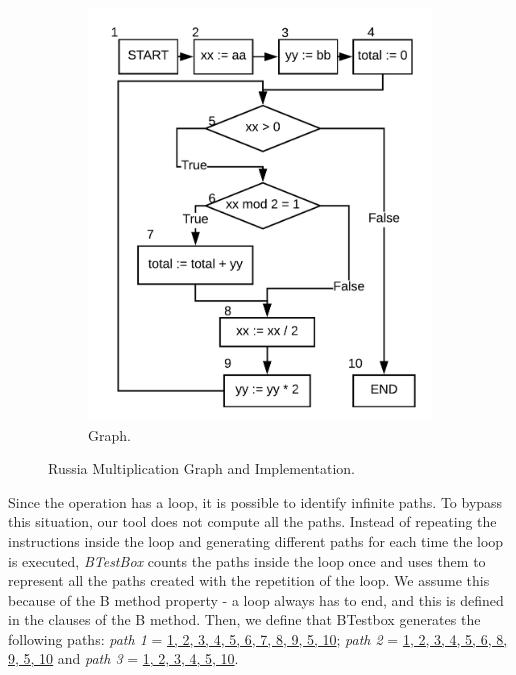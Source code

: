 \documentclass[runningheads]{llncs}
\begin{document}
\begin{figure}
\begin{minipage}{0.45\textwidth}
\begin{subfigure}{\textwidth}
\includegraphics[width = \textwidth]{imagens/lacoGrafo.png}
\caption{Graph.}
\label{fig:russianMultGraph}
\end{subfigure}
\end{minipage}
\caption{Russia Multiplication Graph and Implementation.}
\end{figure}
Since the operation has a loop, it is possible to identify infinite paths. 
To bypass this situation, our tool does not compute all the paths. Instead of repeating the instructions inside the loop and generating different paths for each time the loop is executed, \textit{BTestBox} counts the paths inside the loop once and uses them to represent all the paths created with the repetition of the loop. 
We assume this because of the B method property - a loop always has to end, and this is defined in the clauses of the B method. Then, we define that BTestbox generates the following paths: \textit{path 1} = \ul{1, 2, 3, 4, 5, 6, 7, 8, 9, 5, 10};  \textit{path 2} = \ul{1, 2, 3, 4, 5, 6, 8, 9, 5, 10} and \textit{path 3} = \ul{1, 2, 3, 4, 5, 10}.
\end{document}
